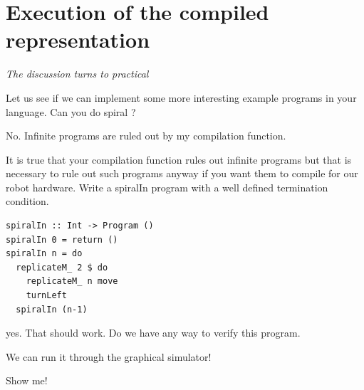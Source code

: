 \section{Execution of the compiled representation} 
\emph{The discussion turns to practical}\newline \newline 
\FloatBarrier

\begin{dialogue}

\speak{\docname{}} Let us see if we can implement some more interesting 
example programs in your language. Can you do spiral ? 

\speak{\studname{}} No. Infinite programs are ruled out by my compilation 
function. 

\speak{\docname{}} It is true that your compilation function rules out 
infinite programs but that is necessary to rule out such programs anyway 
if you want them to compile for our robot hardware. 
\speak{\docname{}} Write a spiralIn program with a well defined termination 
condition. 

\end {dialogue} 

\begin{small}
\begin{verbatim}
spiralIn :: Int -> Program () 
spiralIn 0 = return () 
spiralIn n = do
  replicateM_ 2 $ do
    replicateM_ n move
    turnLeft
  spiralIn (n-1) 
\end{verbatim}
\end{small}

\begin{dialogue} 

\speak{\docname{}} yes. That should work. Do we have any way to verify this 
program. 

\speak{\studname{}} We can run it through the graphical simulator! 

\speak{\docname{}} Show me!

\end{dialogue}  

